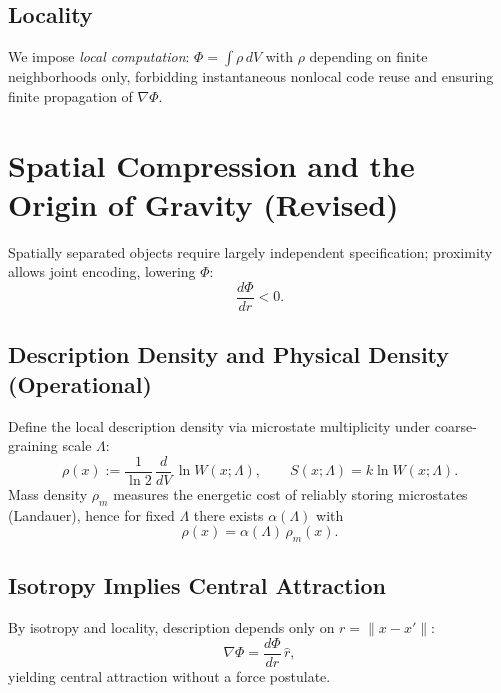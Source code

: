 \documentclass[aps,preprint,onecolumn,longbibliography,nofootinbib]{revtex4-2}
\numberwithin{equation}{section}
\begin{document}
\subsection{Locality}
We impose \emph{local computation}: $\Phi=\int \rho\,dV$ with $\rho$ depending on finite neighborhoods only, forbidding instantaneous nonlocal code reuse and ensuring finite propagation of $\nabla\Phi$.

\section{Spatial Compression and the Origin of Gravity (Revised)}
Spatially separated objects require largely independent specification; proximity allows joint encoding, lowering $\Phi$:
\begin{equation}
\frac{d\Phi}{dr} < 0. \label{eq:dphidr}
\end{equation}

\subsection{Description Density and Physical Density (Operational)}
Define the local description density via microstate multiplicity under coarse-graining scale $\Lambda$:
\begin{equation}
\rho(x) := \frac{1}{\ln 2}\,\frac{d}{dV}\,\ln W(x; \Lambda), \qquad S(x;\Lambda)=k\ln W(x;\Lambda). \label{eq:rhorig}
\end{equation}
Mass density $\rho_m$ measures the energetic cost of reliably storing microstates (Landauer), hence for fixed $\Lambda$ there exists $\alpha(\Lambda)$ with
\begin{equation}
\rho(x) = \alpha(\Lambda)\,\rho_m(x). \label{eq:rho}
\end{equation}

\subsection{Isotropy Implies Central Attraction}
By isotropy and locality, description depends only on $r=\|x-x'\|$:
\begin{equation}
\nabla \Phi = \frac{d\Phi}{dr}\,\hat r, \label{eq:central}
\end{equation}
yielding central attraction without a force postulate.

\end{document}
